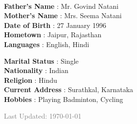 \documentclass[9pt]{myOwnClass}
\begin{document}
	\\
	\begin{minipage}[t]{0.5\textwidth}		
	\textbf{Father's Name} \hspace{5.5mm}: Mr. Govind Natani\\
	\textbf{Mother's Name} \hspace{4mm}: Mrs. Seema Natani\\
	\textbf{Date of Birth} \hspace{8.4mm}: 27 January 1996\\
	\textbf{Hometown} \hspace{11mm}: Jaipur, Rajasthan\\
	\textbf{Languages} \hspace{10.8mm}: English, Hindi\\
	\end{minipage}
	\hfill
	\begin{minipage}[t]{0.5\textwidth}		
	\textbf{Marital Status} \hspace{9mm}: Single\\
	\textbf{Nationality} \hspace{14mm}: Indian\\
	\textbf{Religion} \hspace{18.8mm}: Hindu\\
	\textbf{Current Address} \hspace{5.2mm}: Surathkal, Karnataka\\
	\textbf{Hobbies} \hspace{18.8mm}: Playing Badminton, Cycling\\[0.2in]
	\end{minipage}
\begin{minipage}[t]{1\textwidth}
\begin{flushright}\small\textcolor{gray}{Last Updated: \today}\end{flushright}
\end{minipage}
\end{document}
